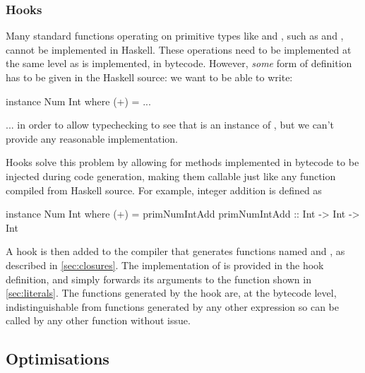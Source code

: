 \documentclass[dissertation.tex]{subfiles}
\begin{document}
{{        \subsubsection{Hooks}
        {

            Many standard functions operating on primitive types like  and , such as
            \haskell{(+)} and \haskell{(==)}, cannot be implemented in Haskell. These operations need to be implemented
            at the same level as  is implemented, in bytecode. However, \textit{some} form of definition
            has to be given in the Haskell source: we want to be able to write:

            \begin{haskellfigure}
            instance Num Int where
                (+) = ...
            \end{haskellfigure}

            ... in order to allow typechecking to see that  is an instance of , but we can't
            provide any reasonable implementation.

            Hooks solve this problem by allowing for methods implemented in bytecode to be injected during code
            generation, making them callable just like any function compiled from Haskell source. For example, integer
            addition is defined as 

            \begin{haskellfigure}
            instance Num Int where
                (+) = primNumIntAdd
            primNumIntAdd :: Int -> Int -> Int
            \end{haskellfigure}

            A hook is then added to the compiler that generates functions named  and
            , as described in \ref{sec:closures}. The implementation of
             is provided in the hook definition, and simply forwards its arguments to the
             function shown in \ref{sec:literals}. The functions generated by the hook are, at the
            bytecode level, indistinguishable from functions generated by any other expression so can be called by any
            other function without issue.



        }
    }
    \subsection{Optimisations}
    {
    
}}
\end{document}
